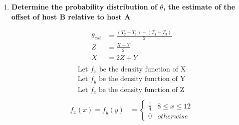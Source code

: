 \documentclass[12pt,a4paper]{article}
\begin{document}
\begin{enumerate}[label=(\alph*)]

\item \textbf{Determine the probability distribution of $\theta$, the estimate of the offset of host B relative to host A}
    
    \begin{equation*}
        \begin{split}
            \theta_{est} &= \frac{(T_2-T_1) - (T_4-T_3)}{2} \\
            Z &= \frac{X - Y}{2} \\
            X &= 2Z + Y \\
        \end{split}
    \end{equation*}
    \begin{equation*}
        \begin{split}
            \text{Let $f_x$ be the density function of X} \\
            \text{Let $f_y$ be the density function of Y} \\
            \text{Let $f_z$ be the density function of Z} \\
        \end{split}
    \end{equation*}
    \begin{equation*}
        \begin{split}
            f_x(x) = f_y(y) &= 
            \begin{cases}
                  \frac{1}{4}   & 8 \leq x \leq 12 \\
                  0             & otherwise
            \end{cases} \\
        \end{split}
    \end{equation*}
    

\end{enumerate}
\end{document}
